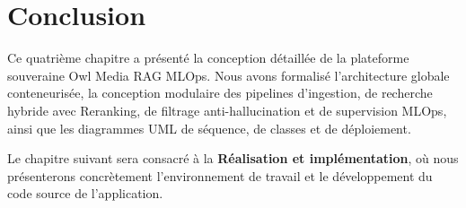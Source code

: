 \section{Conclusion}
Ce quatrième chapitre a présenté la conception détaillée de la plateforme souveraine Owl Media RAG MLOps. Nous avons formalisé l'architecture globale conteneurisée, la conception modulaire des pipelines d'ingestion, de recherche hybride avec Reranking, de filtrage anti-hallucination et de supervision MLOps, ainsi que les diagrammes UML de séquence, de classes et de déploiement. 

Le chapitre suivant sera consacré à la \textbf{Réalisation et implémentation}, où nous présenterons concrètement l'environnement de travail et le développement du code source de l'application.
